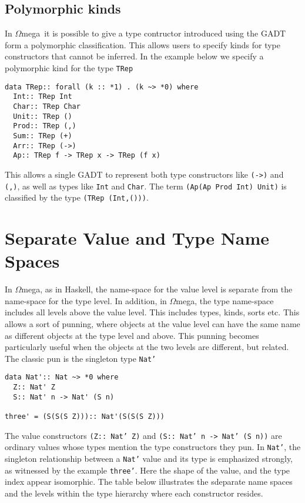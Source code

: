\documentclass[11pt,twoside]{article}
\newcommand{\om}{$\Omega$mega}
\begin{document}
\subsection{Polymorphic kinds}
In \om\ it is possible to give a type contructor
introduced using the GADT form a polymorphic classification.
This allows users to specify kinds
for type constructors that cannot be inferred. In the example
below we specify a polymorphic kind for the type {\tt TRep}
\begin{verbatim} 
data TRep:: forall (k :: *1) . (k ~> *0) where
  Int:: TRep Int   
  Char:: TRep Char
  Unit:: TRep ()
  Prod:: TRep (,)
  Sum:: TRep (+)
  Arr:: TRep (->) 
  Ap:: TRep f -> TRep x -> TRep (f x)
\end{verbatim}    
This allows a single GADT to represent both type constructors like
\verb+(->)+ and \verb+(,)+, as well as types like \verb+Int+ and \verb+Char+.
The term \verb+(Ap(Ap Prod Int) Unit)+ is classified
by the type \verb+(TRep (Int,()))+.

\section{Separate Value and Type Name Spaces}

In \om, as in Haskell, the name-space for the value level is separate from the
name-space for the type level.  In addition, in \om, the type name-space
includes all levels above the value level. This includes types, kinds, sorts
etc. This allows a sort of punning, where objects at the value level can have
the same name as different objects at the type level and above. This punning
becomes particularly useful when the objects at the two levels are different,
but related. The classic pun is the singleton type {\tt Nat'}

\begin{verbatim}
data Nat':: Nat ~> *0 where
  Z:: Nat' Z
  S:: Nat' n -> Nat' (S n)
  
three' = (S(S(S Z))):: Nat'(S(S(S Z)))
\end{verbatim}

The value constructors {\tt (Z:: Nat' Z)} and {\tt (S:: Nat' n ->
Nat' (S n))} are ordinary values whose types mention the type
constructors they pun. In {\tt Nat'}, the singleton relationship
between a {\tt Nat'} value and its type is emphasized 
strongly, as witnessed by the example {\tt three'}. Here the
shape of the value, and the type index appear isomorphic. The table
below illustrates the sdeparate name spaces and the levels within the type
hierarchy where each constructor resides.
\end{document}
